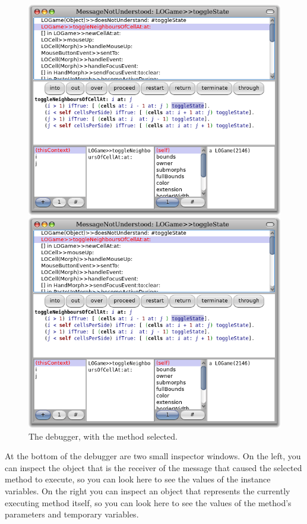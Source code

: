 \documentclass[a4paper,10pt,twoside]{book}
\begin{document}
\begin{figure}[ht]
\ifluluelse
	{\centerline {\includegraphics[width=\textwidth]{Debugger}}}
	{\centerline {\includegraphics[scale=0.7]{Debugger}}}
\caption{The debugger, with the method   selected.
\label{fig:debugToggle}}
\end{figure}

At the bottom of the debugger are two small inspector windows.  On the left, you can inspect the object that is the receiver of the message that caused the selected method to execute, so you can look here to see the values of the instance variables.
On the right you can inspect an object that represents the currently executing method itself, so you can look here to see the values of the method's parameters and temporary variables.
\end{document}
